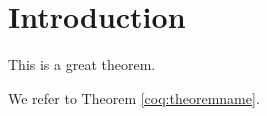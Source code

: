 
\chapter{Introduction}


\begin{theorem}[Test][theoremname]
  This is a great theorem.
\end{theorem}

We refer to Theorem \ref{coq:theoremname}.

